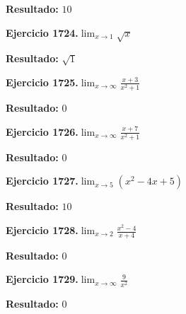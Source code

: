 \documentclass[10pt,a4paper]{article}
\begin{document}
\begin{solbox}
\textbf{Resultado:} \(\displaystyle 10\)
\end{solbox}

\begin{ejbox}
\textbf{Ejercicio 1724.}\quad $\lim_{x\to 1} \sqrt{x}$
\end{ejbox}

\begin{solbox}
\textbf{Resultado:} \(\displaystyle \sqrt{1}\)
\end{solbox}

\begin{ejbox}
\textbf{Ejercicio 1725.}\quad $\lim_{x\to \infty} \frac{x + 3}{x^2 + 1}$
\end{ejbox}

\begin{solbox}
\textbf{Resultado:} \(\displaystyle 0\)
\end{solbox}

\newpage
\begin{ejbox}
\textbf{Ejercicio 1726.}\quad $\lim_{x\to \infty} \frac{x + 7}{x^2 + 1}$
\end{ejbox}

\begin{solbox}
\textbf{Resultado:} \(\displaystyle 0\)
\end{solbox}

\begin{ejbox}
\textbf{Ejercicio 1727.}\quad $\lim_{x\to 5} (x^2 -4x +5)$
\end{ejbox}

\begin{solbox}
\textbf{Resultado:} \(\displaystyle 10\)
\end{solbox}

\begin{ejbox}
\textbf{Ejercicio 1728.}\quad $\lim_{x\to 2} \frac{x^2-4}{x+4}$
\end{ejbox}

\begin{solbox}
\textbf{Resultado:} \(\displaystyle 0\)
\end{solbox}

\newpage
\begin{ejbox}
\textbf{Ejercicio 1729.}\quad $\lim_{x\to \infty} \frac{9}{x^2}$
\end{ejbox}

\begin{solbox}
\textbf{Resultado:} \(\displaystyle 0\)
\end{solbox}
\end{document}
